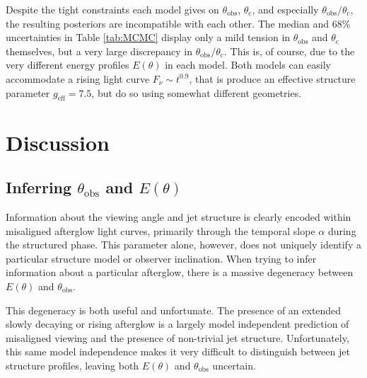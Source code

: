 \documentclass[twocolumn]{aastex62}
\newcommand{\thobs}{\ensuremath{\theta_{\mathrm{obs}}}}
\newcommand{\thC}{\ensuremath{\theta_{\mathrm{c}}}}
\newcommand{\geff}{\ensuremath{g_{\mathrm{eff}}}}
\begin{document}
Despite the tight constraints each model gives on $\thobs$, $\thC$, and especially $\thobs/\thC$, the resulting posteriors are incompatible with each other.  The median and 68\% uncertainties in Table \ref{tab:MCMC} display only a mild tension in $\thobs$  and $\thC$ themselves, but a very large discrepancy in $\thobs/\thC$.  This is, of course, due to the very different energy profiles $E(\theta)$ in each model.  Both models can easily accommodate a rising light curve $F_\nu \sim t^{0.9}$, that is produce an effective structure parameter $\geff = 7.5$, but do so using somewhat different geometries.  


%
%

\section{Discussion}\label{sec:discussion}

\subsection{Inferring $\thobs$ and $E(\theta)$}

Information about the viewing angle and jet structure is clearly encoded within misaligned afterglow light curves, primarily through the temporal slope $\alpha$ during the structured phase.   This parameter alone, however, does not uniquely identify a particular structure model or observer inclination.  When trying to infer information about a particular afterglow, there is a massive degeneracy between $E(\theta)$ and $\thobs$.  

This degeneracy is both useful and unfortunate.  The presence of an extended slowly decaying or rising afterglow is a largely model independent prediction of misaligned viewing and the presence of non-trivial jet structure.  Unfortunately, this same model independence makes it very difficult to distinguish between jet structure profiles, leaving both $E(\theta)$ and $\thobs$ uncertain.
\end{document}
